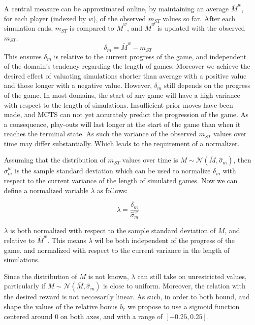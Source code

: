 \documentclass{ecai2010}
\begin{document}
A central measure can be approximated online, by maintaining an average $\bar{M}^w$, for each player (indexed by $w$), of the observed $m_{ST}$ values so far. After each simulation ends, $m_{ST}$ is compared to $\bar{M}^w$, and $\bar{M}^w$ is updated with the observed $m_{ST}$.
\begin{equation}
\delta_m = \bar{M}^w - m_{ST}
\end{equation}
 This ensures $\delta_m$ is relative to the current progress of the game, and independent of the domain's tendency regarding the length of games. Moreover we achieve the desired effect of valuating simulations shorter than average with a positive value and those longer with a negative value. However, $\delta_m$ still depends on the progress of the game. In most domains, the start of any game will have a high variance with respect to the length of simulations. Insufficient prior moves have been made, and MCTS can not yet accurately predict the progression of the game. As a consequence, play-outs will last longer at the start of the game than when it reaches the terminal state. As such the variance of the observed $m_{ST}$ values over time may differ substantially. Which leads to the requirement of a normalizer.

Assuming that the distribution of $m_{ST}$ values over time is $M \sim \mathcal{N}(\bar{M}, \hat{\sigma}_m)$, then $\hat{\sigma}^w_m$ is the sample standard deviation which can be used to normalize $\delta_m$ with respect to the current variance of the length of simulated games. Now we can define a normalized variable $\lambda$ as follows:

\begin{equation}
\lambda = \frac{\delta_m}{\hat{\sigma}^w_m}
\end{equation}

$\lambda$ is both normalized with respect to the sample standard deviation of $M$, and relative to $\bar{M}^w$. This means $\lambda$ wil be both independent of the progress of the game, and normalized with respect to the current variance in the length of simulations.

Since the distribution of $M$ is not known, $\lambda$ can still take on unrestricted values, particularly if $M \sim \mathcal{N}(\bar{M}, \hat{\sigma}_m)$ is close to uniform. Moreover, the relation with the desired reward is not neccesarily linear. As such, in order to both bound, and shape the values of the relative bonus $b_r$ we propose to use a sigmoid function centered around $0$ on both axes, and with a range of $[-0.25, 0.25]$.
\end{document}
